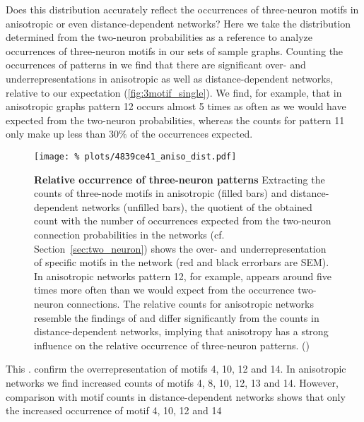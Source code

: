 Does this distribution accurately reflect the occurrences of
three-neuron motifs in anisotropic or even distance-dependent
networks? Here we take the distribution  determined from the two-neuron
probabilities as a reference to analyze occurrences of three-neuron
motifs in our sets of sample graphs. Counting the occurrences of
patterns in we find that there are significant over- and
underrepresentations in anisotropic as well as distance-dependent
networks, relative to our expectation
(\autoref{fig:3motif_single}). We find, for example, that in
anisotropic graphs pattern 12 occurs almost 5 times as often as we
would have expected from the two-neuron probabilities, whereas
the counts for pattern 11 only make up less than $30\%$ of the
occurrences expected.  

\begin{figure}[H]
  \centering
  \texttt{[image: \%
    plots/4839ce41\_aniso\_dist.pdf]}
  \captionsetup{skip=8pt}
  \caption{\textbf{Relative occurrence of three-neuron patterns}
    Extracting the counts of three-node motifs in anisotropic (filled
    bars) and distance-dependent networks (unfilled bars), the
    quotient of the obtained count with the number of occurrences
    expected from the two-neuron connection probabilities in the
    networks (cf. Section~\ref{sec:two_neuron}) shows the over- and
    underrepresentation of specific motifs in the network (red and
    black errorbars are SEM). In anisotropic networks pattern 12, for
    example, appears around five times more often than we would expect
    from the occurrence two-neuron connections. The relative counts
    for anisotropic networks resemble the findings of
    \textcite{Song2005} and differ significantly from the counts in
    distance-dependent networks, implying that anisotropy has a strong
    influence on the relative occurrence of three-neuron
    patterns. () }
  \label{fig:3motif_single}
\end{figure}

This . \textcite{Perin2011} confirm the overrepresentation of motifs
4, 10, 12 and 14. In anisotropic networks we find increased counts of
motifs 4, 8, 10, 12, 13 and 14. However, comparison with motif counts in
distance-dependent networks shows that only the increased occurrence
of motif 4, 10, 12 and 14 



